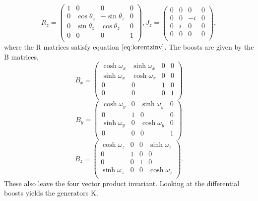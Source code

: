 \documentclass[12pt]{article}
\begin{document}
\begin{equation}
R_z = 
\begin{pmatrix}
1 & 0 & 0 & 0\\
0 & \cos\theta_z & -\sin\theta_z & 0 \\
0 & \sin\theta_z & \cos\theta_z & 0 \\
0 & 0 & 0 & 1 \\
\end{pmatrix},
J_z = 
\begin{pmatrix}
0 & 0 & 0 & 0\\
0 & 0 & -i & 0 \\
0 & i & 0 & 0 \\
0 & 0 & 0 & 0 \\
\end{pmatrix},
\end{equation}
where the R matrices satisfy equation $\ref{eq:lorentzinv}$. The boosts are given by the B matrices, 
\begin{equation}
B_x = 
\begin{pmatrix}
\cosh\omega_x & \sinh\omega_x & 0 & 0 \\
\sinh\omega_x & \cosh\omega_x & 0 & 0 \\
0 & 0 & 1 & 0 \\
0 & 0 & 0 & 1 \\
\end{pmatrix}
\end{equation}
\begin{equation}
B_y = 
\begin{pmatrix}
\cosh\omega_y & 0 & \sinh\omega_y & 0 \\
0 & 1 & 0 & 0 \\
\sinh\omega_y & 0 & \cosh\omega_y & 0 \\
0 & 0 & 0 & 1 \\
\end{pmatrix}
\end{equation}
\begin{equation}
B_z = 
\begin{pmatrix}
\cosh\omega_z & 0 & 0 & \sinh\omega_z \\
0 & 1 & 0 & 0 \\
0 & 0 & 1 & 0 \\
\sinh\omega_z & 0 & 0 & \cosh\omega_z \\
\end{pmatrix}.
\end{equation}
These also leave the four vector product invariant. Looking at the differential boosts yields the generators K.
\end{document}
